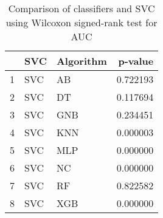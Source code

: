 \begin{table}
\footnotesize
\caption{Comparison of classifiers and SVC using Wilcoxon signed-rank test for AUC}
\label{tab:SVC wilcoxon AUC comparison}
\begin{tabular}{lllr}
\hline
 & SVC & Algorithm & p-value \\
\hline
1 & SVC & AB & 0.722193 \\
2 & SVC & DT & 0.117694 \\
3 & SVC & GNB & 0.234451 \\
4 & SVC & KNN & 0.000003 \\
5 & SVC & MLP & 0.000000 \\
6 & SVC & NC & 0.000000 \\
7 & SVC & RF & 0.822582 \\
8 & SVC & XGB & 0.000000 \\
\hline
\end{tabular}
\end{table}
